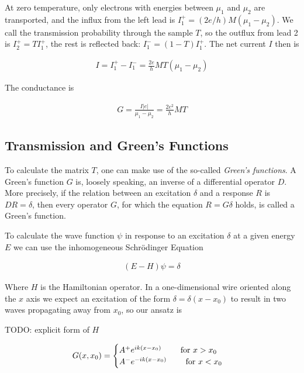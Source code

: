 \documentclass[11pt,twoside]{book}
\begin{document}
At zero temperature, only electrons with energies between $\mu_1$ and $\mu_2$
are transported, and the influx from the left lead is
$I_1^+ = (2e/h)M(\mu_1-\mu_2)$. We call the transmission probability through
the sample $T$, so the outflux from lead 2 is $I_2^+ = T I_1^+$, the rest
is reflected back: $I_1^- = (1-T) I_1^+$. The net current $I$ then is

\begin{align}
    I = I_1^+ - I_1^- = \frac{2e}{h} M T (\mu_1 - \mu_2)
\end{align}

The conductance is

\begin{align}
    G = \frac{I |e|}{\mu_1 - \mu_2} = \frac{2 e^2}{h} MT
\end{align}

\subsection*{Transmission and Green's Functions}

To calculate the matrix $T$, one can make use of the so-called \emph{Green's
functions}. A Green's function $G$ is, loosely speaking, an inverse of a
differential operator $D$. More precisely, if the relation between an
excitation $\delta$ and a response $R$ is $D R = \delta$, then every
operator $G$, for
which the equation $R = G \delta$ holds, is called a Green's function.

To calculate the wave function $\psi$ in response to an excitation $\delta$ at a
given energy $E$ we can use the inhomogeneous Schrödinger Equation

\begin{align}
    \label{eq:green-define}
    (E - H) \psi = \delta
\end{align}

Where $H$ is the Hamiltonian operator. In a one-dimensional wire oriented
along the $x$ axis we expect an excitation of the form
$\delta = \delta(x - x_0)$ to result in two waves propagating away from $x_0$,
so our ansatz is

TODO: explicit form of $H$

\begin{align}
    G(x, x_0) = \begin{cases}
        A^+ e^{i k(x-x_0) } \qquad \textnormal{ for } x > x_0 \\
        A^- e^{-i k(x-x_0) } \qquad \textnormal{ for } x < x_0 \\
    \end{cases}
\end{align}
\end{document}

